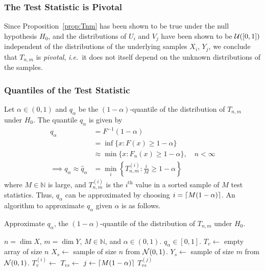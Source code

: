 \documentclass[letterpaper, reqno]{amsart}
\numberwithin{equation}{section}
\DeclarePairedDelimiter{\ceil}{\lceil}{\rceil}
\newcommand{\ie}{\emph{i.e.\ }}
\newcommand{\N}[2]{\mathcal{N}\mleft( #1, #2 \mright)}
\newcommand{\U}[2]{\mathcal{U}\mleft(\mleft[ #1, #2 \mright]\mright)}
\begin{document}
\subsubsection{The Test Statistic is Pivotal}
Since Proposition~\ref{prop:Tnm} has been shown to be true under the null hypothesis $H_0$, and the distributions of $U_i$
and $V_j$ have been shown to be $\U{0}{1}$ independent of the distributions of
the underlying samples $X_i$, $Y_j$, we conclude that $T_{n,m}$ is
\emph{pivotal}, \ie it does not itself depend on the unknown distributions of
the samples.

\clearpage
\subsubsection{Quantiles of the Test Statistic}
Let $\alpha \in (0, 1)$ and $q_\alpha$ be the $(1 - \alpha)$-quantile of the
distribution of $T_{n,m}$ under $H_0$. The quantile $q_\alpha$ is given by
\begin{align*}
  q_\alpha &= F^{-1}(1-\alpha) \\
           &= \inf\{x \colon F(x) \ge 1 - \alpha\} \\
           &\approx \min\{x \colon F_n(x) \ge 1 - \alpha\}, \quad n < \infty \\
           \implies q_\alpha \approx \hat{q}_\alpha &= \min_i \left\{
               T_{n,m}^{(i)} \colon \tfrac{i}{M} \ge 1 - \alpha \right\}
\end{align*}
where $M \in \mathbb{N}$ is large, and $T_{n,m}^{(i)}$ is the $i^\text{th}$
value in a sorted sample of $M$ test statistics. Thus, $q_\alpha$ can be
approximated by choosing $i = \ceil{M(1 - \alpha)}$. An algorithm to approximate
$q_\alpha$ given $\alpha$ is as follows.

\begin{algorithm}[H]
  \caption{Approximate $q_\alpha$, the $(1 - \alpha)$-quantile of the distribution of $T_{n,m}$ under $H_0$.}
  \label{alg:ks_q}
  \begin{algorithmic}
    \Require $n = \dim X$, $m = \dim Y$, $M \in \mathbb{N}$, and $\alpha \in (0, 1)$.
    \Ensure $q_\alpha \in [0, 1]$.
      \State $T_v \gets$ empty array of size $n$
        \State $X_s \gets$ sample of size $n$ from $\N{0}{1}$.
        \State $Y_s \gets$ sample of size $m$ from $\N{0}{1}$.
        \State $T_v^{(i)} \gets$  
      \EndFor
      \State $T_{vs} \gets$ 
      \State $j \gets \ceil*{M(1 - \alpha)}$
      \State \Return $T_{vs}^{(j)}$
    \EndProcedure
  \end{algorithmic}
\end{algorithm}
\end{document}
